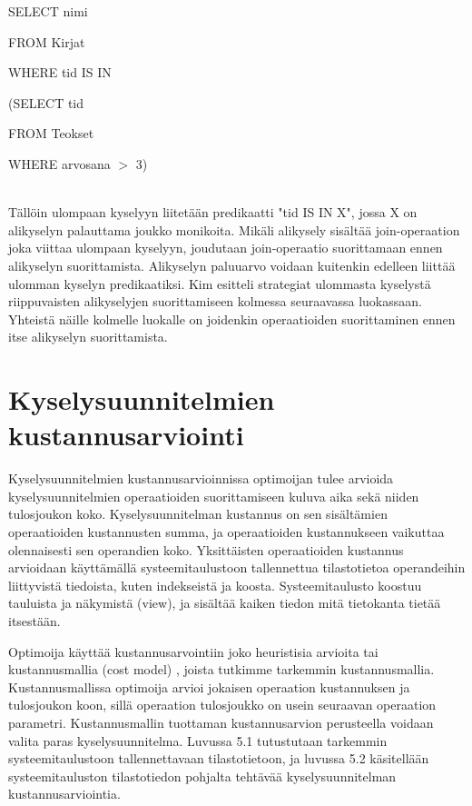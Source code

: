 \documentclass[finnish]{tktltiki2}
\theoremstyle{definition}
\theoremstyle{remark}
\begin{document}
\begin{frame}

SELECT nimi

FROM Kirjat

WHERE tid IS IN 

\hspace*{5mm}(SELECT tid
		
\hspace*{5mm}FROM Teokset

\hspace*{5mm}WHERE arvosana $>$ 3)
\end{frame}
\\\newline
Tällöin ulompaan kyselyyn liitetään predikaatti "tid IS IN X", jossa X on alikyselyn palauttama joukko monikoita. Mikäli alikysely sisältää join-operaation joka viittaa ulompaan kyselyyn, joudutaan join-operaatio suorittamaan ennen alikyselyn suorittamista. Alikyselyn paluuarvo voidaan kuitenkin edelleen liittää ulomman kyselyn predikaatiksi. Kim esitteli strategiat ulommasta kyselystä riippuvaisten alikyselyjen suorittamiseen kolmessa seuraavassa luokassaan. Yhteistä näille kolmelle luokalle on joidenkin operaatioiden suorittaminen ennen itse alikyselyn suorittamista.


\section{Kyselysuunnitelmien kustannusarviointi}
Kyselysuunnitelmien kustannusarvioinnissa optimoijan tulee arvioida kyselysuunnitelmien operaatioiden suorittamiseen kuluva aika sekä niiden tulosjoukon koko. Kyselysuunnitelman kustannus on sen sisältämien operaatioiden kustannusten summa, ja operaatioiden kustannukseen vaikuttaa olennaisesti sen operandien koko. Yksittäisten operaatioiden kustannus arvioidaan käyttämällä systeemitaulustoon tallennettua tilastotietoa operandeihin liittyvistä tiedoista, kuten indekseistä ja koosta. Systeemitaulusto koostuu tauluista ja näkymistä (view), ja sisältää kaiken tiedon mitä tietokanta tietää itsestään.

Optimoija käyttää kustannusarvointiin joko heuristisia arvioita tai kustannusmallia (cost model) \cite{jarke1984}, joista tutkimme tarkemmin kustannusmallia. Kustannusmallissa optimoija arvioi jokaisen operaation kustannuksen ja tulosjoukon koon, sillä operaation tulosjoukko on usein seuraavan operaation parametri. Kustannusmallin tuottaman kustannusarvion perusteella voidaan valita paras kyselysuunnitelma. Luvussa 5.1 tutustutaan tarkemmin systeemitaulustoon tallennettavaan tilastotietoon, ja luvussa 5.2 käsitellään systeemitauluston tilastotiedon pohjalta tehtävää kyselysuunnitelman kustannusarviointia.
\end{document}
